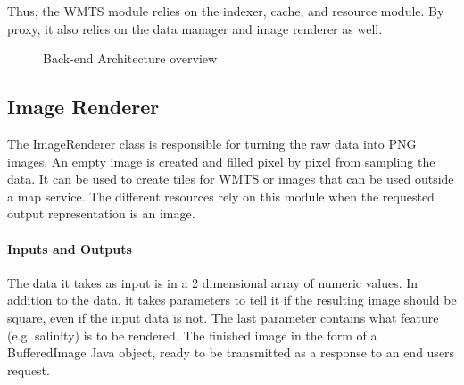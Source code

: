 \documentclass[11pt,a4paper,titlepage,oneside]{report}
\begin{document}
Thus, the \gls{WMTS} module relies on the indexer, cache, and resource module. By proxy, it also relies on the data manager and image renderer as well.

\begin{figure}[!htb]
\begin{center}
\caption{Back-end Architecture overview}
\label{fig:Back-endArchitecture}
\end{center}
\end{figure}


\subsection{Image Renderer}
The ImageRenderer class is responsible for turning the raw data into \gls{PNG} images. An empty image is created and filled pixel by pixel from sampling the data. It can be used to create tiles for \gls{WMTS} or images that can be used outside a map service. The different resources rely on this module when the requested output representation is an image.
\paragraph{Inputs and Outputs}
The data it takes as input is in a 2 dimensional array of numeric values. In addition to the data, it takes parameters to tell it if the resulting image should be square, even if the input data is not. The last parameter contains what feature (e.g. salinity) is to be rendered. The finished image in the form of a BufferedImage Java object, ready to be transmitted as a response to an end users request.
\end{document}
